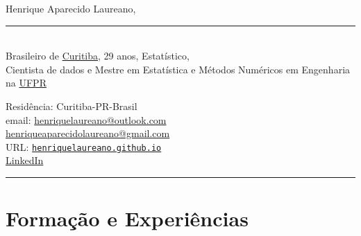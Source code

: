 \documentclass[12pt]{article}
\newcommand{\horrule}[1]{\noindent\rule{\linewidth}{#1}}
\begin{document}
\noindent
\begin{minipage}[t]{.565\textwidth}
 \raggedright
 \large Henrique Aparecido Laureano,
 \noindent\rule{.89\linewidth}{1pt}\\
 \normalsize Brasileiro de
 \href{https://goo.gl/K1Qcdv}{\color{blue}Curitiba}, 29 anos,
 Estat\'{i}stico,\\Cientista de dados e Mestre em Estatística e
 M\'{e}todos Num\'{e}ricos em Engenharia na
 \href{https://goo.gl/DtVAbi}{\color{blue}UFPR}
\end{minipage}%
\begin{minipage}[t]{.435\textwidth}
 \raggedright
 Resid\^{e}ncia: Curitiba-PR-Brasil\\
 email:
 \href{mailto:henriquelaureano@outlook.com}{\color{blue}
   henriquelaureano@outlook.com}\\
 \hspace{1.2cm}
 \href{mailto:henriqueaparecidolaureano@gmail.com}{\color{blue}
   henriqueaparecidolaureano@gmail.com}\\
 URL:
 \href{https://henriquelaureano.github.io/}{
  \color{blue}\texttt{henriquelaureano.github.io}}\\
 \href{https://www.linkedin.com/in/henrique-laureano-025328179}{
  \color{blue}LinkedIn}
\end{minipage}

\vspace{0.5cm}
\horrule{1pt}

\vspace{-0.25cm}
\section*{Forma\c{c}\~{a}o e Experi\^{e}ncias}
\end{document}
